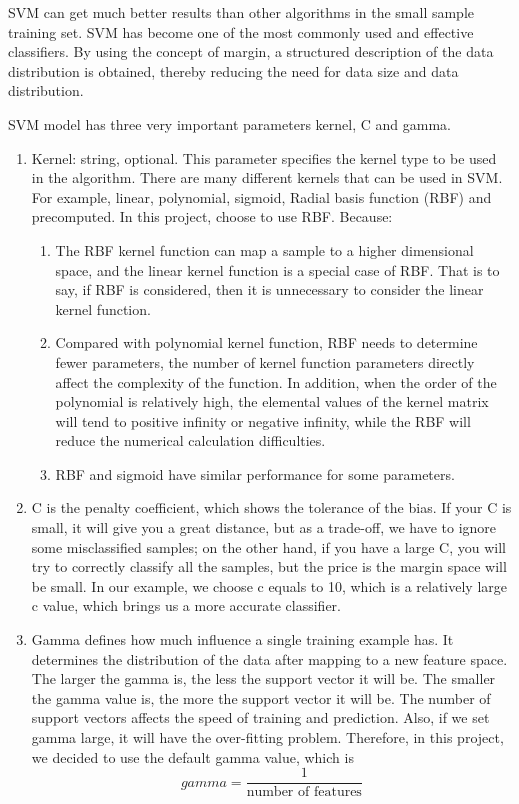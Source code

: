 \documentclass[sigconf]{acmart}
\begin{document}
SVM can get much better results than other algorithms in the small sample training set. SVM has become one of the most commonly used and effective classifiers. By using the concept of margin, a structured description of the data distribution is obtained, thereby reducing the need for data size and data distribution. 

SVM model has three very important parameters kernel, C and gamma\cite{sklearn.svm}. 
\begin{enumerate}
    \item Kernel: string, optional. This parameter specifies the kernel type to be used in the algorithm. There are many different kernels that can be used in SVM. For example, linear, polynomial, sigmoid, Radial basis function (RBF) and precomputed. In this project, choose to use RBF. Because:
    \begin{enumerate}
        \item The RBF kernel function can map a sample to a higher dimensional space, and the linear kernel function is a special case of RBF. That is to say, if RBF is considered, then it is unnecessary to consider the linear kernel function.
        \item Compared with polynomial kernel function, RBF needs to determine fewer parameters, the number of kernel function parameters directly affect the complexity of the function. In addition, when the order of the polynomial is relatively high, the elemental values of the kernel matrix will tend to positive infinity or negative infinity, while the RBF will reduce the numerical calculation difficulties.
        \item RBF and sigmoid have similar performance for some parameters.
    \end{enumerate}
    \item C is the penalty coefficient, which shows the tolerance of the bias. If your C is small, it will give you a great distance, but as a trade-off, we have to ignore some misclassified samples; on the other hand, if you have a large C, you will try to correctly classify all the samples, but the price is the margin space will be small. In our example, we choose c equals to 10, which is a relatively large c value, which brings us a more accurate classifier. 
    \item Gamma defines how much influence a single training example has. It determines the distribution of the data after mapping to a new feature space. The larger the gamma is, the less the support vector it will be. The smaller the gamma value is, the more the support vector it will be. The number of support vectors affects the speed of training and prediction. Also, if we set gamma large, it will have the over-fitting problem. Therefore, in this project, we decided to use the default gamma value, which is 
    \begin{equation*}
     gamma=\frac{1}{\text{number of features}}
    \end{equation*}
\end{enumerate}
\end{document}
